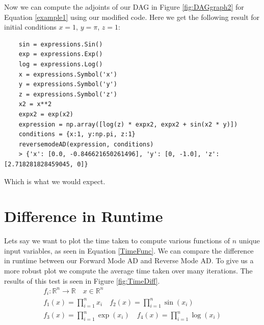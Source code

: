 \documentclass{article}
\begin{document}
Now we can compute the adjoints of our DAG in Figure \ref{fig:DAGgraph2} for Equation \ref{example1} using our modified code. Here we get the following result for initial conditions $x=1$, $y=\pi$, $z=1$:

\begin{verbatim}
    sin = expressions.Sin()
    exp = expressions.Exp()
    log = expressions.Log()
    x = expressions.Symbol('x')
    y = expressions.Symbol('y')
    z = expressions.Symbol('z')
    x2 = x**2
    expx2 = exp(x2)
    expression = np.array([log(z) * expx2, expx2 + sin(x2 * y)])
    conditions = {x:1, y:np.pi, z:1}
    reversemodeAD(expression, conditions)
    > {'x': [0.0, -0.846621650261496], 'y': [0, -1.0], 'z': [2.718281828459045, 0]}
\end{verbatim}

Which is what we would expect.



\newpage
\section{Difference in Runtime}

Lets say we want to plot the time taken to compute various functions of $n$ unique input variables, as seen in Equation \ref{TimeFunc}. We can compare the difference in runtime between our Forward Mode AD and Reverse Mode AD. To give us a more robust plot we compute the average time taken over many iterations. The results of this test is seen in Figure \ref{fig:TimeDiff}.
\begin{equation} \label{TimeFunc}
    \begin{gathered}
        f_i: \mathbb{R}^n \longrightarrow \mathbb{R} \quad x \in \mathbb{R}^n \\
        f_1(x) = \prod_{i=1}^n x_i  \quad f_2(x) = \prod_{i=1}^n \sin(x_i) \\
        f_3(x) = \prod_{i=1}^n \exp(x_i)  \quad f_4(x) = \prod_{i=1}^n \log(x_i)
    \end{gathered}
\end{equation}
\end{document}
